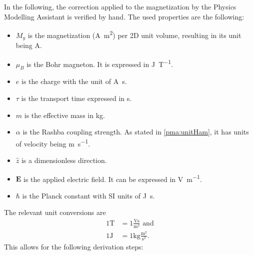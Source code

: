 \documentclass[
	fontsize = 11pt,
	paper = a4,
	draft = false,
	twoside = true,
	titlepage = false
]{scrartcl}
\numberwithin{equation}{subsection}
\begin{document}
	In the following, the correction applied to the magnetization by the Physics Modelling Assistant is verified by hand. The used properties are the following:
	\begin{itemize}
		\item $M_y$ is the magnetization (\si{\ampere \meter^2}) per 2D unit volume, resulting in its unit being \si{\ampere}.
		\item $\mu_B$ is the Bohr magneton. It is expressed in \si{\joule \tesla^{-1}}.
		\item $e$ is the charge with the unit of \si{\ampere \second}.
		\item $\tau$ is the transport time expressed in \si{\second}.
		\item $m$ is the effective mass in \si{\kilogram}.
		\item $\alpha$ is the Rashba coupling strength. As stated in \autoref{pma:unitHam}, it has units of velocity being \si{\meter\second^{-1}}.
		\item $\hat{z}$ is a dimensionless direction.
		\item $\mathbf{E}$ is the applied electric field. It can be expressed in \si{\volt\meter^{-1}}.
		\item $\hbar$ is the Planck constant with SI units of \si{\joule \second}.
	\end{itemize}
	The relevant unit conversions are
	\begin{align}
		1 \si{\tesla} &= 1 \frac{\si{\volt \second}}{\si{\meter^2}} \label{con:tesla} \text{  and} \\
		1 \si{\joule} &= 1 \si{\kilogram} \frac{\si{\meter^2}}{\si{\second^2}} \label{con:joule} \textbf{.}
	\end{align}
	This allows for the following derivation steps: 
\end{document}
